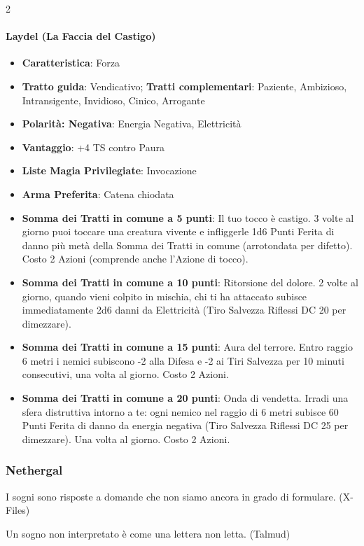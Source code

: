 \begin{multicols}{2}
\paragraph{Laydel (La Faccia del Castigo)}
\begin{itemize}[leftmargin=*] \setlength{\itemsep}{0pt}
\item \textbf{Caratteristica}: Forza
\item \textbf{Tratto guida}: Vendicativo; \textbf{Tratti complementari}: Paziente, Ambizioso, Intransigente, Invidioso, Cinico, Arrogante
\item \textbf{Polarità: Negativa}: Energia Negativa, Elettricità
\item \textbf{Vantaggio}: +4 TS contro Paura
\item \textbf{Liste Magia Privilegiate}: Invocazione
\item \textbf{Arma Preferita}: Catena chiodata
\item \textbf{Somma dei Tratti in comune a 5 punti}: Il tuo tocco è castigo. 3 volte al giorno puoi toccare una creatura vivente e infliggerle 1d6 Punti Ferita di danno più metà della Somma dei Tratti in comune (arrotondata per difetto). Costo 2 Azioni (comprende anche l'Azione di tocco).
\item \textbf{Somma dei Tratti in comune a 10 punti}: Ritorsione del dolore. 2 volte al giorno, quando vieni colpito in mischia, chi ti ha attaccato subisce immediatamente 2d6 danni da Elettricità (Tiro Salvezza Riflessi DC 20 per dimezzare).
\item \textbf{Somma dei Tratti in comune a 15 punti}: Aura del terrore. Entro raggio 6 metri i nemici subiscono -2 alla Difesa e -2 ai Tiri Salvezza per 10 minuti consecutivi, una volta al giorno. Costo 2 Azioni.
\item \textbf{Somma dei Tratti in comune a 20 punti}: Onda di vendetta. Irradi una sfera distruttiva intorno a te: ogni nemico nel raggio di 6 metri subisce 60 Punti Ferita di danno da energia negativa (Tiro Salvezza Riflessi DC 25 per dimezzare). Una volta al giorno. Costo 2 Azioni.
\end{itemize}

\subsubsection{Nethergal}\label{nethergal}\hypertarget{nethergal}{}

\begin{enfasi}{
I sogni sono risposte a domande che non siamo ancora in grado di formulare. (X-Files)

\medskip

Un sogno non interpretato è come una lettera non letta. (Talmud)
}\end{enfasi}


\end{multicols}
